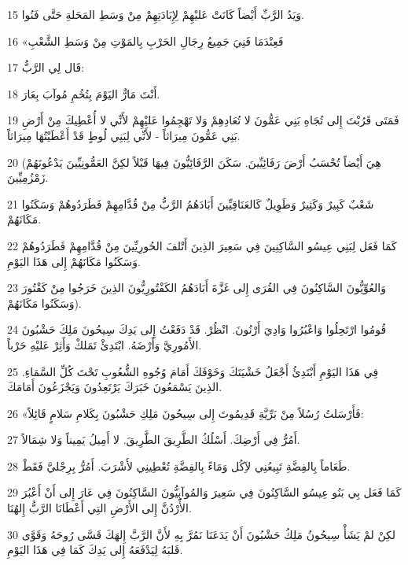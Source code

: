 \par 15 وَيَدُ الرَّبِّ أَيْضاً كَانَتْ عَليْهِمْ لِإِبَادَتِهِمْ مِنْ وَسَطِ المَحَلةِ حَتَّى فَنُوا.
\par 16 «فَعِنْدَمَا فَنِيَ جَمِيعُ رِجَالِ الحَرْبِ بِالمَوْتِ مِنْ وَسَطِ الشَّعْبِ
\par 17 قَال لِي الرَّبُّ:
\par 18 أَنْتَ مَارٌّ اليَوْمَ بِتُخُمِ مُوآبَ بِعَارَ.
\par 19 فَمَتَى قَرُبْتَ إِلى تُجَاهِ بَنِي عَمُّونَ لا تُعَادِهِمْ وَلا تَهْجِمُوا عَليْهِمْ لأَنِّي لا أُعْطِيكَ مِنْ أَرْضِ بَنِي عَمُّونَ مِيرَاثاً - لأَنِّي لِبَنِي لُوطٍ قَدْ أَعْطَيْتُهَا مِيرَاثاً.
\par 20 (هِيَ أَيْضاً تُحْسَبُ أَرْضَ رَفَائِيِّينَ. سَكَنَ الرَّفَائِيُّونَ فِيهَا قَبْلاً لكِنَّ العَمُّونِيِّينَ يَدْعُونَهُمْ زَمْزُمِيِّينَ.
\par 21 شَعْبٌ كَبِيرٌ وَكَثِيرٌ وَطَوِيلٌ كَالعَنَاقِيِّينَ أَبَادَهُمُ الرَّبُّ مِنْ قُدَّامِهِمْ فَطَرَدُوهُمْ وَسَكَنُوا مَكَانَهُمْ.
\par 22 كَمَا فَعَل لِبَنِي عِيسُو السَّاكِنِينَ فِي سَعِيرَ الذِينَ أَتْلفَ الحُورِيِّينَ مِنْ قُدَّامِهِمْ فَطَرَدُوهُمْ وَسَكَنُوا مَكَانَهُمْ إِلى هَذَا اليَوْمِ.
\par 23 وَالعُوِّيُّونَ السَّاكِنُونَ فِي القُرَى إِلى غَزَّةَ أَبَادَهُمُ الكَفْتُورِيُّونَ الذِينَ خَرَجُوا مِنْ كَفْتُورَ وَسَكَنُوا مَكَانَهُمْ).
\par 24 قُومُوا ارْتَحِلُوا وَاعْبُرُوا وَادِيَ أَرْنُونَ. انْظُرْ. قَدْ دَفَعْتُ إِلى يَدِكَ سِيحُونَ مَلِكَ حَشْبُونَ الأَمُورِيَّ وَأَرْضَهُ. ابْتَدِئْ تَمَلكْ وَأَثِرْ عَليْهِ حَرْباً.
\par 25 فِي هَذَا اليَوْمِ أَبْتَدِئُ أَجْعَلُ خَشْيَتَكَ وَخَوْفَكَ أَمَامَ وُجُوهِ الشُّعُوبِ تَحْتَ كُلِّ السَّمَاءِ. الذِينَ يَسْمَعُونَ خَبَرَكَ يَرْتَعِدُونَ وَيَجْزَعُونَ أَمَامَكَ.
\par 26 «فَأَرْسَلتُ رُسُلاً مِنْ بَرِّيَّةِ قَدِيمُوتَ إِلى سِيحُونَ مَلِكِ حَشْبُونَ بِكَلامِ سَلامٍ قَائِلاً:
\par 27 أَمُرُّ فِي أَرْضِكَ. أَسْلُكُ الطَّرِيقَ الطَّرِيقَ. لا أَمِيلُ يَمِيناً وَلا شِمَالاً.
\par 28 طَعَاماً بِالفِضَّةِ تَبِيعُنِي لآِكُل وَمَاءً بِالفِضَّةِ تُعْطِينِي لأَشْرَبَ. أَمُرُّ بِرِجْليَّ فَقَطْ.
\par 29 كَمَا فَعَل بِي بَنُو عِيسُو السَّاكِنُونَ فِي سَعِيرَ وَالمُوآبِيُّونَ السَّاكِنُونَ فِي عَارَ إِلى أَنْ أَعْبُرَ الأُرْدُنَّ إِلى الأَرْضِ التِي أَعْطَانَا الرَّبُّ إِلهُنَا.
\par 30 لكِنْ لمْ يَشَأْ سِيحُونُ مَلِكُ حَشْبُونَ أَنْ يَدَعَنَا نَمُرَّ بِهِ لأَنَّ الرَّبَّ إِلهَكَ قَسَّى رُوحَهُ وَقَوَّى قَلبَهُ لِيَدْفَعَهُ إِلى يَدِكَ كَمَا فِي هَذَا اليَوْمِ.
